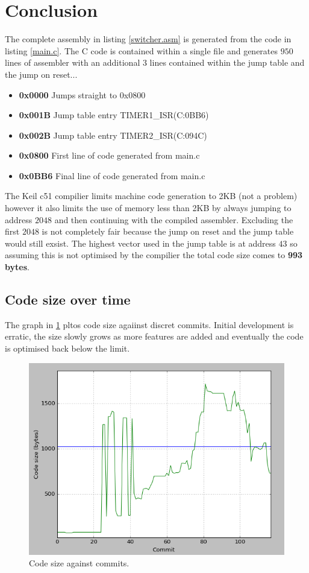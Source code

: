 \documentclass[12pt]{article}%
\begin{document}
\section{Conclusion}

The complete assembly in listing \ref{switcher.asm} is generated from the code in listing \ref{main.c}. The C code is contained within a single file and generates $950$ lines of assembler with an additional $3$ lines contained within the jump table and the jump on reset...

\begin{itemize}
  	\item \textbf{0x0000} Jumps straight to 0x0800
	\item \textbf{0x001B} Jump table entry TIMER1\_ISR(C:0BB6)
	\item \textbf{0x002B} Jump table entry TIMER2\_ISR(C:094C)
	\item \textbf{0x0800} First line of code generated from main.c
  	\item \textbf{0x0BB6} Final line of code generated from main.c
\end{itemize}

The Keil c51 compilier limits machine code generation to 2KB (not a problem) however it also limits the use of memory less than 2KB by always jumping to address $2048$ and then continuing with the compiled assembler. Excluding the first $2048$ is not completely fair because the jump on reset and the jump table would still exsist. The highest vector used in the jump table is at address $43$ so assuming this is not optimised by the compilier the total code size comes to \textbf{993 bytes}.

\subsection{Code size over time}

The graph in \ref{fig:size} pltos code size agaiinst discret commits. Initial development is erratic, the size slowly grows as more features are added and eventually the code is optimised  back below the limit.

\begin{figure}[H]
	\centering
  	\includegraphics[width=12cm]{size.png}
  	\caption{Code size against commits.}
  	\label{fig:size}
\end{figure}
\end{document}
